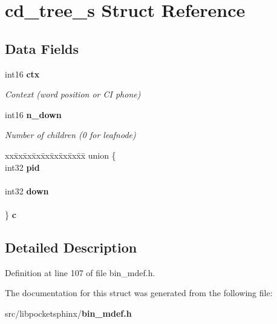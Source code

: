 \section{cd\-\_\-tree\-\_\-s Struct Reference}
\label{structcd__tree__s}
\subsection*{Data Fields}
\begin{DoxyCompactItemize}
\item 
int16 {\bf ctx}\label{structcd__tree__s_a2168538bf6cc21ad1a2c99fa2deb4559}

\begin{DoxyCompactList}\small\item\em Context (word position or C\-I phone) \end{DoxyCompactList}\item 
int16 {\bf n\-\_\-down}\label{structcd__tree__s_ae5e735d325b0f278ff2ad55293faa616}

\begin{DoxyCompactList}\small\item\em Number of children (0 for leafnode) \end{DoxyCompactList}\item 
\begin{tabbing}
xx\=xx\=xx\=xx\=xx\=xx\=xx\=xx\=xx\=\kill
union \{\\
\>int32 {\bf pid}\\
\>\\
\>int32 {\bf down}\\
\>\\
\} {\bfseries c}\label{structcd__tree__s_acc49ddc3248fc58d5a9bf241fffcbc2b}
\\

\end{tabbing}\end{DoxyCompactItemize}


\subsection{Detailed Description}


Definition at line 107 of file bin\-\_\-mdef.\-h.



The documentation for this struct was generated from the following file\-:\begin{DoxyCompactItemize}
\item 
src/libpocketsphinx/{\bf bin\-\_\-mdef.\-h}\end{DoxyCompactItemize}
